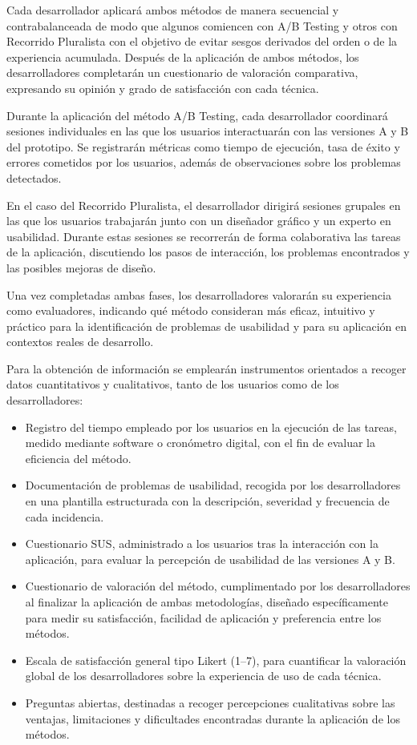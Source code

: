\documentclass[a4paper,12pt]{report}
\begin{document}
Cada desarrollador aplicará ambos métodos de manera secuencial y contrabalanceada de modo que algunos comiencen con A/B Testing y otros con Recorrido Pluralista con el objetivo de evitar sesgos derivados del orden o de la experiencia acumulada.
Después de la aplicación de ambos métodos, los desarrolladores completarán un cuestionario de valoración comparativa, expresando su opinión y grado de satisfacción con cada técnica.

Durante la aplicación del método A/B Testing, cada desarrollador coordinará sesiones individuales en las que los usuarios interactuarán con las versiones A y B del prototipo. 
Se registrarán métricas como tiempo de ejecución, tasa de éxito y errores cometidos por los usuarios, además de observaciones sobre los problemas detectados.

En el caso del Recorrido Pluralista, el desarrollador dirigirá sesiones grupales en las que los usuarios trabajarán junto 
con un diseñador gráfico y un experto en usabilidad. 
Durante estas sesiones se recorrerán de forma colaborativa las tareas de la aplicación, discutiendo los pasos de interacción, 
los problemas encontrados y las posibles mejoras de diseño.

Una vez completadas ambas fases, los desarrolladores valorarán su experiencia como evaluadores, indicando qué método consideran más eficaz, intuitivo y práctico para la identificación de problemas de usabilidad y 
para su aplicación en contextos reales de desarrollo.

Para la obtención de información se emplearán instrumentos orientados a recoger datos cuantitativos y cualitativos, tanto de los usuarios como de los desarrolladores:


\begin{itemize}
    \item Registro del tiempo empleado por los usuarios en la ejecución de las tareas, medido mediante software o cronómetro digital, con el fin de evaluar la eficiencia del método.
    \item Documentación de problemas de usabilidad, recogida por los desarrolladores en una plantilla estructurada con la descripción, severidad y frecuencia de cada incidencia.
    \item Cuestionario SUS, administrado a los usuarios tras la interacción con la aplicación, para evaluar la percepción de usabilidad de las versiones A y B.
    \item Cuestionario de valoración del método, cumplimentado por los desarrolladores al finalizar la aplicación de ambas metodologías, diseñado específicamente para medir su satisfacción, facilidad de aplicación y preferencia entre los métodos.
    \item Escala de satisfacción general tipo Likert (1–7), para cuantificar la valoración global de los desarrolladores sobre la experiencia de uso de cada técnica.
    \item Preguntas abiertas, destinadas a recoger percepciones cualitativas sobre las ventajas, limitaciones y dificultades encontradas durante la aplicación de los métodos.

\end{itemize}
\end{document}
